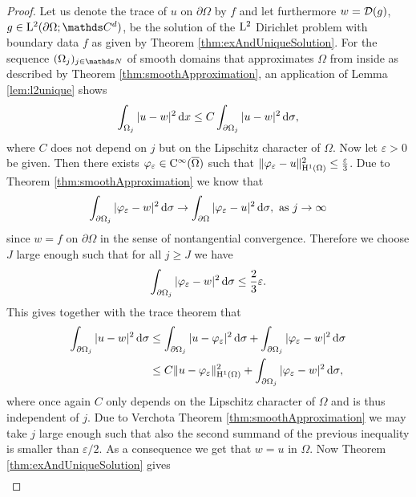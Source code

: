 \begin{proof}
  Let us denote the trace of $u$ on $\partial\Omega$ by $f$ and let furthermore $w = \mathcal{D}(g)$, $g \in \Ell^2(\partial\Omega; \C^d)$, be the solution of the $\mathrm{L}^2$ Dirichlet problem with boundary data $f$ as given by Theorem \ref{thm:exAndUniqueSolution}.
  For the sequence $(\Omega_j)_{j \in \N}$ of smooth domains that approximates $\Omega$ from inside as described by Theorem \ref{thm:smoothApproximation}, an application of Lemma \ref{lem:l2unique} shows
  \begin{align}
    \int_{\Omega_j} |u - w|^2 \, {\operatorname{d}\!{x}} \leq C \int_{\partial\Omega_j} |u - w|^2 \, {\operatorname{d}\!{\sigma}},
  \end{align}
  where $C$ does not depend on $j$ but on the Lipschitz character of $\Omega$.
  Now let $\varepsilon > 0$ be given. 
  Then there exists $\varphi_\varepsilon \in \mathrm{C}^\infty(\overline\Omega)$ such that $\|\varphi_\varepsilon - u\|_{\mathrm{H}^1(\Omega)}^2 \leq \frac{\varepsilon}{3}$.
  Due to Theorem \ref{thm:smoothApproximation} we know that 
  \begin{align*}
    \int_{\partial\Omega_j} |\varphi_\varepsilon - w|^2 \, {\operatorname{d}\!{\sigma}} \to \int_{\partial\Omega} |\varphi_\varepsilon - u|^2 \, {\operatorname{d}\!{\sigma}}, \text{ as } j \to \infty
  \end{align*}
  since $w = f$ on $\partial\Omega$ in the sense of nontangential convergence.
  Therefore we choose $J$ large enough such that for all $j \geq J$ we have
  \begin{align*}
    \int_{\partial\Omega_j} |\varphi_\varepsilon - w|^2 \, {\operatorname{d}\!{\sigma}} \leq \frac{2}{3} \varepsilon.
  \end{align*}
  This gives together with the trace theorem that
  \begin{align*}
    \int_{\partial\Omega_j} |u - w|^2 \, {\operatorname{d}\!{\sigma}} 
    &\leq \int_{\partial\Omega_j} |u - \varphi_\varepsilon |^2 \, {\operatorname{d}\!{\sigma}} + \int_{\partial\Omega_j} |\varphi_\varepsilon - w|^2 \, {\operatorname{d}\!{\sigma}} \\
    &\leq C \| u - \varphi_\varepsilon \|_{\mathrm{H}^1(\Omega)}^2 + \int_{\partial\Omega_j} |\varphi_\varepsilon - w|^2 \, {\operatorname{d}\!{\sigma}},
  \end{align*}
  where once again $C$ only depends on the Lipschitz character of $\Omega$ and is thus independent of $j$.
  Due to Verchota Theorem \ref{thm:smoothApproximation} we may take $j$ large enough such that also the second summand of the previous inequality is smaller than $\varepsilon/2$.
  As a consequence we get that $w = u$ in $\Omega$.
  Now Theorem \ref{thm:exAndUniqueSolution} gives
  \begin{align*}

\end{align*}
\end{proof}
